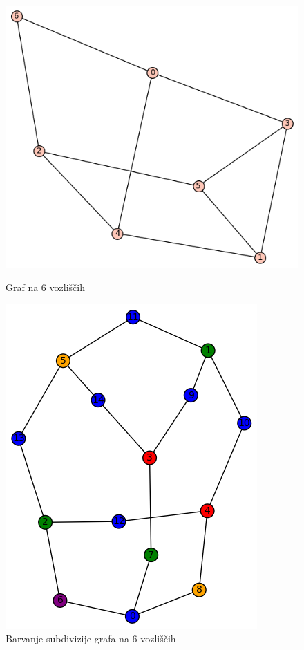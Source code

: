 \documentclass[11pt,a4paper,titlepage]{article}
\begin{document}
\begin{figure}[h]
	\centering
	\begin{minipage}{0.45\textwidth}
		\centering
		\includegraphics[width=\linewidth]{orig_6_1.png}
		\caption{Graf na 6 vozliščih}
	\end{minipage}
	\hfill
	\begin{minipage}{0.45\textwidth}
		\centering
		\includegraphics[width=\linewidth]{sub_6_1.png}
		\caption{Barvanje subdivizije grafa na 6 vozliščih}
	\end{minipage}
\end{figure}
\end{document}
